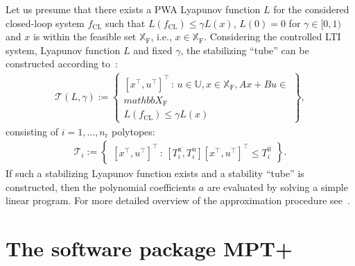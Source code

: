 \documentclass[letterpaper, 10 pt, conference]{ieeeconf}
\begin{document}
Let us presume that there exists a PWA Lyapunov function $L$ for the considered closed-loop system $f_{\mathrm{CL}}$ such that $L(f_{\mathrm{CL}}) \le \gamma L(x)$, $L(0) = 0$ for $\gamma \in [0,1)$ and $x$ is within the feasible set $\mathbb{X}_{\mathrm{F}}$, i.e., $x \in \mathbb{X}_{\mathrm{F}}$. Considering the controlled LTI system, Lyapunov function $L$ and fixed $\gamma$, the stabilizing ``tube'' can be constructed according to~\cite{tube_FCh}:
\begin{eqnarray}
	\label{eq:stab_tube}
	\mathcal{T}(L, \gamma) := \begin{Bmatrix}
		[x^\top, u^\top]^\top \, : \, u \in \mathbb{U}, x \in \mathbb{X}_{\mathrm{F}} , A x + B u \in \\mathbb{X}_{\mathrm{F}} \\
		L(f_{\mathrm{CL}}) \le \gamma L(x)
	\end{Bmatrix} , 
\end{eqnarray}
consisting of $i = 1, \dots, n_\mathrm{r}$ polytopes:
\begin{eqnarray}
	\label{eq:stab_tube_polytope}
	\mathcal{T}_i := \begin{Bmatrix}
		[x^\top, u^\top]^\top \, : \, [T_i^{\mathrm{x}}, T_i^{\mathrm{u}}] [x^\top, u^\top]^\top \le T_i^0		
	\end{Bmatrix}. 
\end{eqnarray}
If such a stabilizing Lyapunov function exists and a stability ``tube'' is constructed, then the polynomial coefficients $a$ are evaluated by solving a simple linear program. For more detailed overview of the approximation procedure see~\cite{kvasnica_polynomial}.

%


\section{The software package MPT+}
\label{sec:code}
\end{document}
